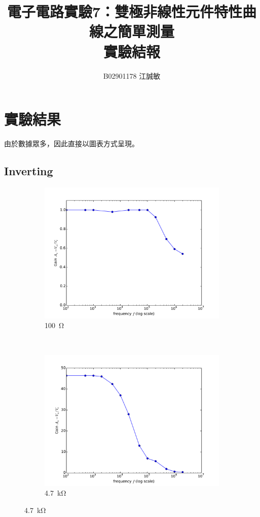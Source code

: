 \documentclass[12pt, a4paper]{article}
\title{ \bf {\Huge 電子電路實驗7：雙極非線性元件特性曲線之簡單測量}\\ 實驗結報}
\author{B02901178 江誠敏}
\begin{document}
\maketitle


\section{實驗結果}
由於數據眾多，因此直接以圖表方式呈現。
\subsection{Inverting}
\begin{figure}[H]
  \centering
  \begin{subfigure}[b]{0.45\textwidth}
    \includegraphics[width=1\textwidth]{img/q1.pdf}
    \caption{\SI{100}\ohm}
  \end{subfigure}
  ~
  \begin{subfigure}[b]{0.45\textwidth}
    \includegraphics[width=1\textwidth]{img/q2.pdf}
    \caption{\SI{4.7}\kohm}
  \end{subfigure}
\end{figure}
\end{document}
